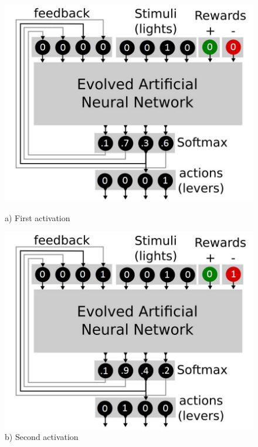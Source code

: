 \documentclass[12pt,twoside]{article}
\theoremstyle{plain}
\theoremstyle{definition}
\theoremstyle{remark}
\begin{document}
\begin{figure}[!tbp]
	\centering
	\begin{minipage}[b]{0.4\textwidth}
		\includegraphics[width=\textwidth]{network_structure_input1.png}
		\captionsetup{labelformat=empty}
		\caption*{a) First activation}
	\end{minipage}
	\hfill
	\begin{minipage}[b]{0.4\textwidth}
		\includegraphics[width=\textwidth]{network_structure_input2.png}
		\captionsetup{labelformat=empty}
		\caption*{b) Second activation}
	\end{minipage}	

\end{figure}
\end{document}

